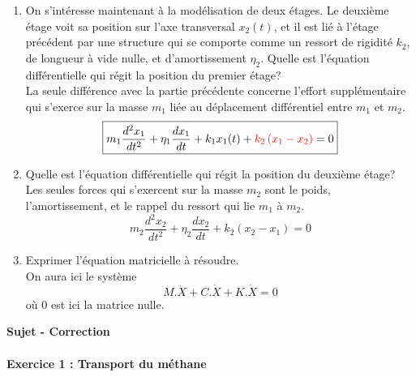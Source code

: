 \documentclass[a4paper,10pt,notitlepage,oneside]{article}
\theoremstyle{plain}
\begin{document}
\begin{enumerate}
    \item On s'intéresse maintenant à la modélisation de deux étages. Le deuxième étage voit sa position sur l'axe transversal $x_2(t)$, et il est lié à l'étage précédent par une structure qui se comporte comme un ressort de rigidité $k_2$, de longueur à vide nulle, et d'amortissement $\eta_2$.
    Quelle est l'équation différentielle qui régit la position du premier étage?\\
    La seule différence avec la partie précédente concerne l'effort supplémentaire qui s'exerce sur la masse $m_1$ liée au déplacement différentiel entre $m_1$ et $m_2$.
    \begin{equation*}
        \boxed{
         m_1\dfrac{d^2x_1}{dt^2}+\eta_1\dfrac{dx_1}{dt}+k_1 x_1(t) +\textcolor{red}{k_2\left(x_1-x_2\right)} = 0
        }
    \end{equation*}
    \item Quelle est l'équation différentielle qui régit la position du deuxième étage?\\
    Les seules forces qui s'exercent sur la masse $m_2$ sont le poids, l'amortissement, et le rappel du ressort qui lie $m_1$ à $m_2$.
    \begin{equation*}
        \boxed{
         m_2\dfrac{d^2x_2}{dt^2}+\eta_2\dfrac{dx_2}{dt}+ k_2\left(x_2-x_1\right) = 0
        }
    \end{equation*}
    \item Exprimer l'équation matricielle à résoudre.\\
    On aura ici le système
    \begin{equation*}
        \boxed{
        M .\ddot X + C .\dot X+K.\dot X = 0
        }
    \end{equation*}
    où $0$ est ici la matrice nulle.
\end{enumerate}


\newpage


\begin{center}
    {\color{BlueViolet} \Large \textbf{\color{BlueViolet}Sujet  - Correction}}
\end{center}

\paragraph{\color{BlueViolet} Exercice 1 : Transport du méthane}
\end{document}
